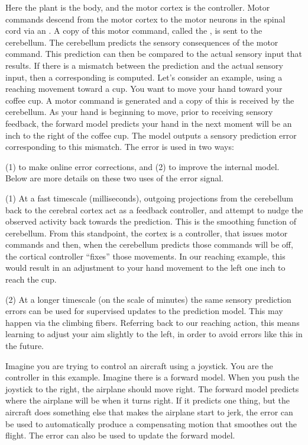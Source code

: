  Here the plant is the body, and the motor cortex is the controller. Motor commands descend from the motor cortex to the motor neurons in the spinal cord via an . A copy of this motor command, called the , is sent to the cerebellum. The cerebellum predicts the sensory consequences of the motor command. This prediction can then be compared to the actual sensory input that results. If there is a mismatch between the prediction and the actual sensory input, then a corresponding  is computed. Let's consider an example, using a reaching movement toward a cup. You want to move your hand toward your coffee cup. A motor command is generated and a copy of this is received by the cerebellum. As your hand is beginning to move, prior to receiving sensory feedback, the forward model predicts your hand in the next moment will be an inch to the right of the coffee cup. The model outputs a sensory prediction error corresponding to this mismatch. The error is used in two ways: 

(1) to make online error corrections, and (2) to improve the internal model. Below are more details on these two uses of the error signal.
 
(1) At a fast timescale (milliseconds), outgoing projections from the cerebellum back to the cerebral cortex act as a feedback controller, and attempt to nudge the observed activity back towards the prediction. This is the smoothing function of cerebellum. From this standpoint, the cortex is a controller, that issues motor commands and then, when the cerebellum predicts those commands will be off, the cortical controller ``fixes'' those movements. In our reaching example, this would result in an adjustment to your hand movement to the left one inch to reach the cup.

(2) At a longer timescale (on the scale of minutes) the same sensory prediction errors can be used for supervised updates to the prediction model. This may happen via the climbing fibers. Referring back to our reaching action, this means learning to adjust your aim slightly to the left, in order to avoid errors like this in the future.

Imagine you are trying to control an aircraft using a joystick. You are the controller in this example. Imagine there is a  forward model. When you push the joystick to the right, the airplane should move right. The forward model predicts where the airplane will be when it turns right. If it predicts one thing, but the aircraft does something else that makes the airplane start to jerk, the error can be used to automatically produce a compensating motion that smoothes out the flight. The error can also be used to update the forward model. 



